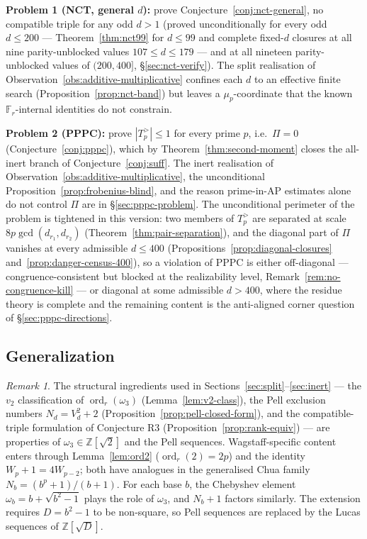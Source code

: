 \documentclass[11pt]{amsart}
\theoremstyle{plain}
\theoremstyle{definition}
\theoremstyle{remark}
\newtheorem*{remarknonum}{Remark}
\numberwithin{equation}{section}
\newcommand{\ord}{\operatorname{ord}}
\newcommand{\Z}{\mathbb{Z}}
\newcommand{\F}{\mathbb{F}}
\begin{document}
\textbf{Problem 1 (NCT, general $d$):} prove Conjecture~\ref{conj:nct-general}, no compatible triple for any odd $d > 1$ (proved unconditionally for every odd $d \leq 200$ --- Theorem~\ref{thm:nct99} for $d \leq 99$ and complete fixed-$d$ closures at all nine parity-unblocked values $107 \leq d \leq 179$ --- and at all nineteen parity-unblocked values of $(200,400]$, \S\ref{sec:nct-verify}). The split realisation of Observation~\ref{obs:additive-multiplicative} confines each $d$ to an effective finite search (Proposition~\ref{prop:nct-band}) but leaves a $\mu_p$-coordinate that the known $\F_r$-internal identities do not constrain.

\textbf{Problem 2 (PPPC):} prove $|T_p^{>}| \leq 1$ for every prime $p$, i.e.\ $\Pi = 0$ (Conjecture~\ref{conj:pppc}), which by Theorem~\ref{thm:second-moment} closes the all-inert branch of Conjecture~\ref{conj:suff}. The inert realisation of Observation~\ref{obs:additive-multiplicative}, the unconditional Proposition~\ref{prop:frobenius-blind}, and the reason prime-in-AP estimates alone do not control $\Pi$ are in \S\ref{sec:pppc-problem}. The unconditional perimeter of the problem is tightened in this version: two members of $T_p^{>}$ are separated at scale $8 p \gcd(d_{r_1}, d_{r_2})$ (Theorem~\ref{thm:pair-separation}), and the diagonal part of $\Pi$ vanishes at every admissible $d \leq 400$ (Propositions~\ref{prop:diagonal-closures} and~\ref{prop:danger-census-400}), so a violation of PPPC is either off-diagonal --- congruence-consistent but blocked at the realizability level, Remark~\ref{rem:no-congruence-kill} --- or diagonal at some admissible $d > 400$, where the residue theory is complete and the remaining content is the anti-aligned corner question of \S\ref{sec:pppc-directions}.

\subsection{Generalization}\label{sec:generalization}

\begin{remarknonum}
The structural ingredients used in Sections~\ref{sec:split}--\ref{sec:inert} --- the $v_2$ classification of $\ord_r(\omega_3)$ (Lemma~\ref{lem:v2-class}), the Pell exclusion numbers $N_d = V_d^2 + 2$ (Proposition~\ref{prop:pell-closed-form}), and the compatible-triple formulation of Conjecture R3 (Proposition~\ref{prop:rank-equiv}) --- are properties of $\omega_3 \in \Z[\sqrt 2]$ and the Pell sequences. Wagstaff-specific content enters through Lemma~\ref{lem:ord2} ($\ord_r(2) = 2 p$) and the identity $W_p + 1 = 4 W_{p-2}$; both have analogues in the generalised Chua family $N_b = (b^p + 1)/(b + 1)$. For each base $b$, the Chebyshev element $\omega_b = b + \sqrt{b^2 - 1}$ plays the role of $\omega_3$, and $N_b + 1$ factors similarly. The extension requires $D = b^2 - 1$ to be non-square, so Pell sequences are replaced by the Lucas sequences of $\Z[\sqrt D]$.
\end{remarknonum}
\end{document}
